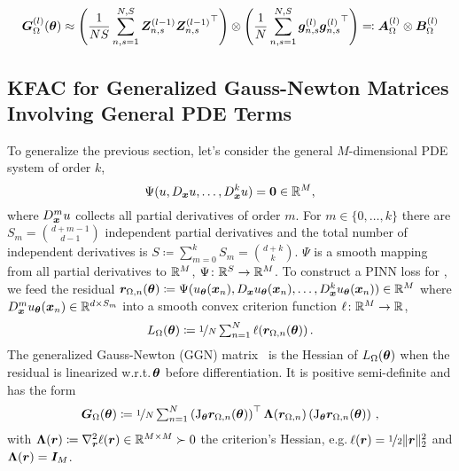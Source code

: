 \begin{tcolorbox}[colframe=kfac, title={KFAC for the Gauss-Newton matrix of a Laplace operator},bottom=0mm,top=-2mm,middle=0mm]
  \begin{align}\label{eq:KFAC-PINN}
    {\bm{G}}^{(l)}_\Omega({\bm{\theta}})
    \approx
    \left( \frac{1}{N S} \sum_{n,s=1}^{N,S} {\bm{Z}}^{(l-1)}_{n,s}{{\bm{Z}}^{(l-1)}_{n,s}}^\top \right )
    \otimes
    \left(
    \frac{1}{N}
    \sum_{n,s=1}^{N,S} {\bm{g}}^{(l)}_{n,s}{{\bm{g}}^{(l)}_{n,s}}^\top
    \right)
    \eqqcolon
    {\bm{A}}_{\Omega}^{(l)} \otimes {\bm{B}}_{\Omega}^{(l)}
  \end{align}
\end{tcolorbox}

\subsection{KFAC for Generalized Gauss-Newton Matrices Involving General PDE Terms} \label{sec:KFAC-general}
To generalize the previous section, let's consider the general $M$-dimensional PDE system of order $k$,
\begin{equation}\label{eq:general-pde-system}
  \Psi(u, D_{{\bm{x}}} u, \dots, D^k_{{\bm{x}}} u) = {\bm{0}} \in {\mathbb{R}}^M,
\end{equation}
where $D^m_{\bm{x}} u$ collects all partial derivatives of order $m$.
For $m\in \{0, \dots, k\}$ there are $S_m = \binom{d + m - 1}{d - 1}$ independent partial derivatives and the total number of independent derivatives is $S \coloneqq \sum_{m=0}^k S_{m} = \binom{d + k}{k}$.
$\Psi$ is a smooth mapping from all partial derivatives to ${\mathbb{R}}^M$, $\Psi\colon \mathbb {{\mathbb{R}}}^S\to\mathbb {{\mathbb{R}}}^M$.
To construct a PINN loss for , we feed the residual ${\bm{r}}_{\Omega, n}({\bm{\theta}}) \coloneqq \Psi(u_{{\bm{\theta}}}({\bm{x}}_n), D_{{\bm{x}}} u_{{\bm{\theta}}}({\bm{x}}_n), \dots, D^k_{{\bm{x}}} u_{{\bm{\theta}}}({\bm{x}}_n)) \in {\mathbb{R}}^M$ where $D^{m}_{{\bm{x}}} u_{{\bm{\theta}}}({\bm{x}}_n) \in {\mathbb{R}}^{d \times S_{m}}$ into a smooth convex criterion function $\ell\colon {\mathbb{R}}^M \to {\mathbb{R}}$,
\begin{equation}
  L_{\Omega}({\bm{\theta}})\coloneqq \nicefrac{1}{N}
  \textstyle
  \sum_{n=1}^N \ell({\bm{r}}_{\Omega,n}({\bm{\theta}}))\,.
\end{equation}
The generalized Gauss-Newton (GGN) matrix~\cite{schraudolph2002fast} is the Hessian of $L_{\Omega}({\bm{\theta}})$ when the residual is linearized w.r.t.\,${\bm{\theta}}$ before differentiation. It is positive semi-definite and has the form
\begin{align}
  {\bm{G}}_{\Omega}({\bm{\theta}})
  \coloneqq
  \nicefrac{1}{N}
  \textstyle
  \sum_{n=1}^N
  \left(\mathrm{J}_{\bm{\theta}} {\bm{r}}_{\Omega,n}({\bm{\theta}})  \right)^\top
  {\bm{\Lambda}}({\bm{r}}_{\Omega,n})
  \left(\mathrm{J}_{\bm{\theta}} {\bm{r}}_{\Omega, n}({\bm{\theta}}) \right)\,,
\end{align}
with ${\bm{\Lambda}}({\bm{r}}) \coloneqq \nabla^2_{{\bm{r}}} \ell({\bm{r}}) \in {\mathbb{R}}^{M\times M} \succ 0$ the criterion's Hessian, e.g.\,$\ell({\bm{r}}) = \nicefrac{1}{2} \lVert {\bm{r}} \rVert_2^2$ and ${\bm{\Lambda}}({\bm{r}}) = {\bm{I}}_M$.

